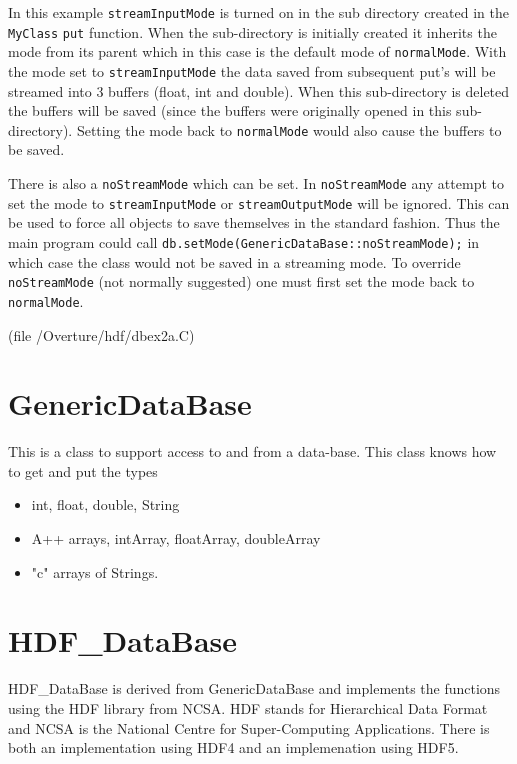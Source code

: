 \documentclass{article}
\newcommand{\dataBase}{\homeHenshaw/Overture/hdf}
\begin{document}
In this example {\tt streamInputMode} is turned on in the sub directory created
in the {\tt MyClass} {\tt put} function. When the sub-directory is initially created it inherits
the mode from its parent which in this case is the default mode of {\tt normalMode}.
With the mode set to {\tt streamInputMode} the data saved from subsequent put's 
will be streamed into 3 buffers (float, int and double).
When this sub-directory is deleted the buffers will be saved (since the buffers were
originally opened in this sub-directory). 
Setting the mode back to {\tt normalMode} would also cause the buffers to be saved. 


There is also a {\tt noStreamMode}
which can be set. In {\tt noStreamMode} any attempt to set the mode to {\tt streamInputMode} or
{\tt streamOutputMode} will be ignored. 
This can be used
to force all objects to save themselves in the standard fashion. Thus the main program
could call {\tt db.setMode(GenericDataBase::noStreamMode);} in which case the class
would not be saved in a streaming mode.
To override {\tt noStreamMode} (not normally suggested) 
one must first set the mode back to {\tt normalMode}.


(file {\ff \dataBase/dbex2a.C})
{\footnotesize
\listinginput[1]{1}{\dataBase/dbex2a.C}
}

\section{GenericDataBase}

 This is a class to support access to and from a data-base.
This class knows how to get and put the types
\begin{itemize}
  \item int, float, double, String
  \item A++ arrays, intArray, floatArray, doubleArray
  \item "c" arrays of Strings.
\end{itemize}



\vfill\eject
\section{HDF\_DataBase}

HDF\_DataBase is derived from GenericDataBase and implements the
functions using the HDF library from NCSA. HDF stands for
Hierarchical Data Format and NCSA is the National Centre for
Super-Computing Applications. There is both an implementation using HDF4 and
an implemenation using HDF5.
\end{document}
